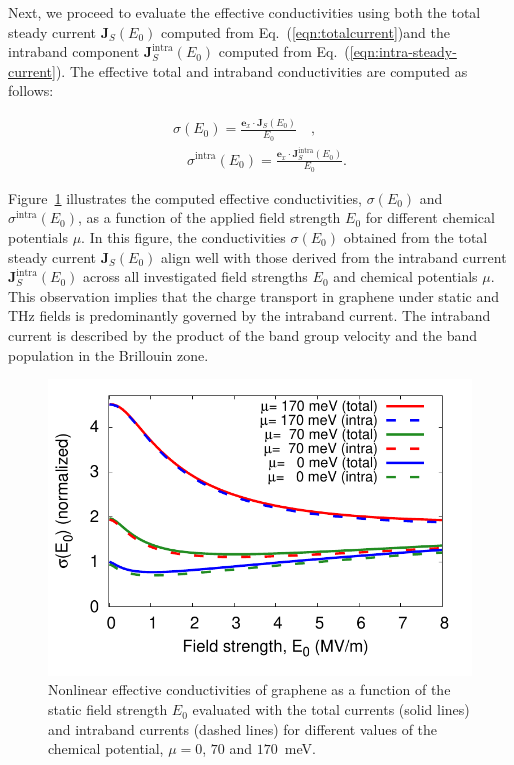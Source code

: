 Next, we proceed to evaluate the effective conductivities using both the total steady current
$\mathbf J_S(E_0)$ computed from Eq.~(\ref{eqn:totalcurrent})and the intraband component $\mathbf J^{\mathrm{intra}}_S(E_0)$ computed from Eq.~(\ref{eqn:intra-steady-current}). The effective total
and intraband conductivities are computed as follows:

\begin{align}
	\sigma(E_0)=\frac{\mathbf e_x\cdot \mathbf J_S(E_0)}{E_0} \quad, \\
	\quad \sigma^{\mathrm{intra}}(E_0)=\frac{\mathbf e_x\cdot \mathbf J^{\mathrm{intra}}_S(E_0)}{E_0}.
\end{align}

Figure~\ref{fig:conductivity} illustrates the computed effective conductivities, $\sigma(E_0)$ and $\sigma^{\mathrm{intra}}(E_0)$, as a function of the applied field strength $E_0$ for different chemical potentials $\mu$. In this figure, the conductivities $\sigma(E_0)$ obtained from the total steady current $\mathbf J_S(E_0)$ align well with those derived from the intraband current $ \mathbf J^{\mathrm{intra}}_S(E_0)$ across all investigated field strengths $E_0$ and chemical potentials $\mu$. This observation implies that the charge transport in graphene under static and THz fields is predominantly governed by the intraband current. The intraband current is described by the product of the band group velocity and the band population in the Brillouin zone.


\begin{figure}[htbp]
	\centering
	\includegraphics[width=0.8 \linewidth]{pic/sigma_vs_E0.pdf}
	\caption{\label{fig:conductivity}
		Nonlinear effective conductivities of graphene as a function of the static field strength $E_0$ evaluated with the total currents (solid lines) and intraband currents (dashed lines) for different values of the chemical potential, $\mu = 0$, $70$ and $170$~meV.}
\end{figure}

